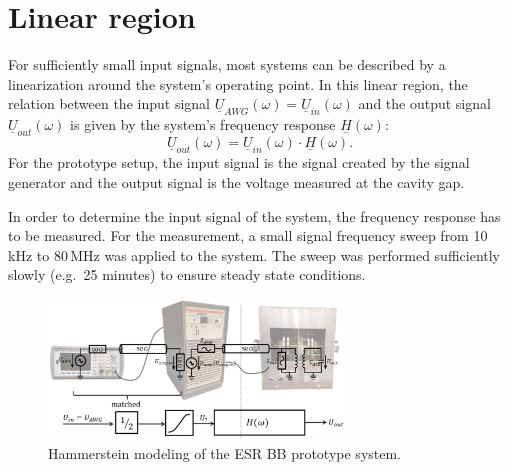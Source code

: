 \documentclass[a4paper,
               keeplastbox,%
               nospread%
              ]{jacow}
\begin{document}
	\section{Linear region}
	For sufficiently small input signals, 
	most systems can be described by a linearization around the system's operating point.
	In this linear region, the relation between the input signal $\underline{U}_{AWG}(\omega)=\underline{U}_{in}(\omega)$ and the output signal 
	$\underline{U}_{out}(\omega)$ is given by the system's frequency response $\underline{H}(\omega)$:
	\begin{equation}
	 \underline{U}_{out}(\omega)=\underline{U}_{in}(\omega)\cdot\underline{H}(\omega).
	 \label{H}
	\end{equation}
	For the prototype setup, the input signal is the signal created by the signal generator and the output signal is the voltage measured at the cavity gap.
	
	In order to determine the input signal of the system, the frequency response has to be measured. %
For the measurement, a small signal frequency sweep from 10\,kHz to 80\,MHz was applied to the system. The sweep was performed sufficiently slowly
	(e.g.~25 minutes) to ensure steady state conditions. 
	
	\begin{figure}[!tbh]
	\centering
	\includegraphics*[width=0.7\textwidth]{WEPVA047f2.eps}
	\caption{Hammerstein modeling of the ESR BB prototype system.}
	\label{Modellierung}
	\end{figure}
	
\end{document}
